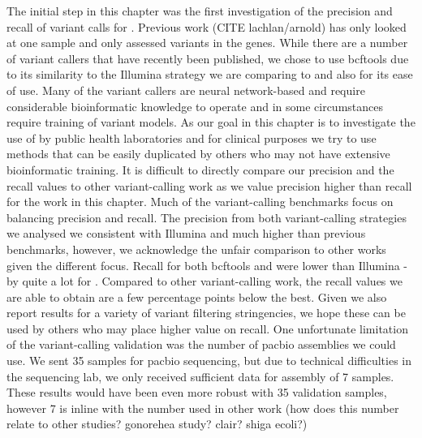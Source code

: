 The initial step in this chapter was the first investigation of the precision and recall of \ont{} variant calls for \mtb{}. Previous work (CITE lachlan/arnold) has only looked at one sample and only assessed variants in the \ppe{} genes. While there are a number of \ont{} variant callers that have recently been published, we chose to use bcftools due to its similarity to the Illumina strategy we are comparing to and also for its ease of use. Many of the \ont{} variant callers are neural network-based and require considerable bioinformatic knowledge to operate and in some circumstances require training of variant models. As our goal in this chapter is to investigate the use of \ont{} by public health laboratories and for clinical purposes we try to use methods that can be easily duplicated by others who may not have extensive bioinformatic training. It is difficult to directly compare our precision and the recall values to other \ont{} variant-calling work as we value precision higher than recall for the work in this chapter. Much of the \ont{} variant-calling benchmarks focus on balancing precision and recall. The precision from both \ont{} variant-calling strategies we analysed we consistent with Illumina and much higher than previous \ont{} benchmarks, however, we acknowledge the unfair comparison to other works given the different focus. Recall for both bcftools and \pandora{} were lower than Illumina - by quite a lot for \pandora{}. Compared to other \ont{} variant-calling work, the recall values we are able to obtain are a few percentage points below the best. Given we also report results for a variety of variant filtering stringencies, we hope these can be used by others who may place higher value on recall.
One unfortunate limitation of the variant-calling validation was the number of pacbio assemblies we could use. We sent 35 samples for pacbio sequencing, but due to technical difficulties in the sequencing lab, we only received sufficient data for assembly of 7 samples. These results would have been even more robust with 35 validation samples, however 7 is inline with the number used in other work (how does this number relate to other studies? gonorehea study? clair? shiga ecoli?)

